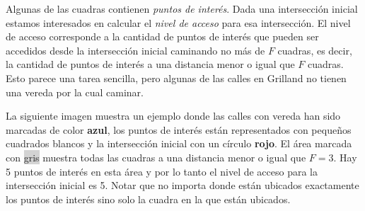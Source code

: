 \documentclass{oci}
\begin{document}
\begin{problemDescription}
  Algunas de las cuadras contienen \emph{puntos de interés}.
  Dada una intersección inicial estamos interesados en calcular el \emph{nivel de acceso} para
  esa intersección.
  El nivel de acceso corresponde a la cantidad de puntos de interés que pueden ser accedidos
  desde la intersección inicial caminando no más de $F$ cuadras, es decir, la cantidad de puntos de
  interés a una distancia menor o igual que $F$ cuadras.
  Esto parece una tarea sencilla, pero algunas de las calles en Grilland no tienen una vereda por la
  cual caminar.

  La siguiente imagen muestra un ejemplo donde las calles con vereda han sido marcadas de color
  {\bf\color{blue}azul}, los puntos de interés están representados con pequeños cuadrados blancos
  y la intersección inicial con un círculo {\bf\color{red}rojo}.
  El área marcada con \colorbox{lightgray}{gris} muestra todas las cuadras a una distancia
  menor o igual que $F=3$.
  Hay 5 puntos de interés en esta área y por lo tanto el nivel de acceso para la intersección
  inicial es 5.
  Notar que no importa donde están ubicados exactamente los puntos de interés sino solo la cuadra
  en la que están ubicados.

  \begin{center}
\end{center}
\end{problemDescription}
\end{document}

